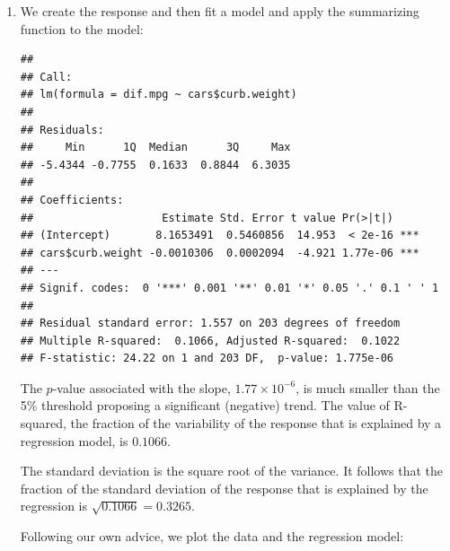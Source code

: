 \documentclass[
]{krantz}
\makeatletter
\newenvironment{Shaded}{\begin{snugshade}}{\end{snugshade}}
\newcommand{\KeywordTok}[1]{\textcolor[rgb]{0.13,0.29,0.53}{\textbf{#1}}}
\newcommand{\NormalTok}[1]{#1}
\newcommand{\OperatorTok}[1]{\textcolor[rgb]{0.81,0.36,0.00}{\textbf{#1}}}
\newcommand{\StringTok}[1]{\textcolor[rgb]{0.31,0.60,0.02}{#1}}
\newenvironment{kframe}{%
\medskip{}
\setlength{\fboxsep}{.8em}
 \def\at@end@of@kframe{}%
 \ifinner\ifhmode%
  \def\at@end@of@kframe{\end{minipage}}%
  \begin{minipage}{\columnwidth}%
 \fi\fi%
 \def\FrameCommand##1{\hskip\@totalleftmargin \hskip-\fboxsep
 \colorbox{shadecolor}{##1}\hskip-\fboxsep
     \hskip-\linewidth \hskip-\@totalleftmargin \hskip\columnwidth}%
 \MakeFramed {\advance\hsize-\width
   \@totalleftmargin\z@ \linewidth\hsize
   \@setminipage}}%
 {\par\unskip\endMakeFramed%
 \at@end@of@kframe}
\renewenvironment{Shaded}{\begin{kframe}}{\end{kframe}}
\theoremstyle{definition}
\theoremstyle{definition}
\theoremstyle{definition}
\theoremstyle{remark}
\makeatother
\begin{document}
\begin{enumerate}
\def\labelenumi{\arabic{enumi}.}
\item
  We create the response and then
  fit a model and apply the summarizing function to the model:

\begin{Shaded}
\end{Shaded}

\begin{verbatim}
## 
## Call:
## lm(formula = dif.mpg ~ cars$curb.weight)
## 
## Residuals:
##     Min      1Q  Median      3Q     Max 
## -5.4344 -0.7755  0.1633  0.8844  6.3035 
## 
## Coefficients:
##                    Estimate Std. Error t value Pr(>|t|)    
## (Intercept)       8.1653491  0.5460856  14.953  < 2e-16 ***
## cars$curb.weight -0.0010306  0.0002094  -4.921 1.77e-06 ***
## ---
## Signif. codes:  0 '***' 0.001 '**' 0.01 '*' 0.05 '.' 0.1 ' ' 1
## 
## Residual standard error: 1.557 on 203 degrees of freedom
## Multiple R-squared:  0.1066, Adjusted R-squared:  0.1022 
## F-statistic: 24.22 on 1 and 203 DF,  p-value: 1.775e-06
\end{verbatim}

  The \(p\)-value associated with the slope, \(1.77\times 10^{-6}\), is much
  smaller than the 5\% threshold proposing a significant (negative) trend.
  The value of R-squared, the fraction of the variability of the response
  that is explained by a regression model, is \(0.1066\).

  The standard deviation is the square root of the variance. It follows
  that the fraction of the standard deviation of the response that is
  explained by the regression is \(\sqrt{0.1066}= 0.3265\).

  Following our own advice, we plot the data and the regression model:

\begin{Shaded}
\end{Shaded}


\end{enumerate}
\end{document}
